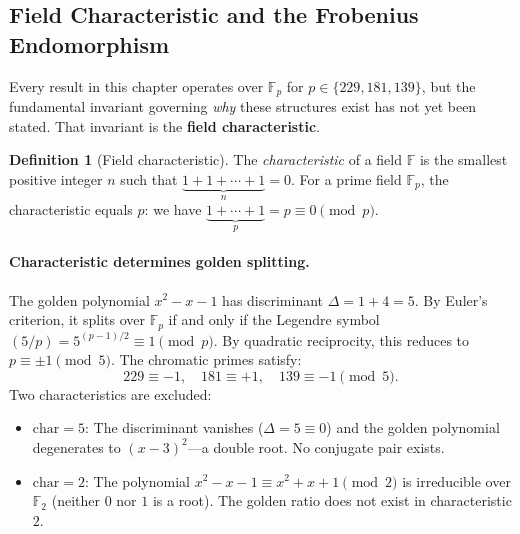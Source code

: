 \documentclass[12pt,oneside]{article}
\theoremstyle{principia}
\theoremstyle{definition}
\newtheorem{definition}[theorem]{Definition}
\theoremstyle{remark}
\begin{document}
\subsection{Field Characteristic and the Frobenius Endomorphism}
\label{sec:characteristic}

Every result in this chapter operates over $\mathbb{F}_p$ for $p \in \{229, 181, 139\}$, but the fundamental invariant governing \emph{why} these structures exist has not yet been stated. That invariant is the \textbf{field characteristic}.

\begin{definition}[Field characteristic]
The \emph{characteristic} of a field $\mathbb{F}$ is the smallest positive integer $n$ such that $\underbrace{1 + 1 + \cdots + 1}_{n} = 0$. For a prime field $\mathbb{F}_p$, the characteristic equals $p$: we have $\underbrace{1 + \cdots + 1}_{p} = p \equiv 0 \pmod{p}$.
\end{definition}

\paragraph{Characteristic determines golden splitting.}
The golden polynomial $x^2 - x - 1$ has discriminant $\Delta = 1 + 4 = 5$. By Euler's criterion, it splits over $\mathbb{F}_p$ if and only if the Legendre symbol $(5/p) = 5^{(p-1)/2} \equiv 1 \pmod{p}$. By quadratic reciprocity, this reduces to $p \equiv \pm 1 \pmod{5}$. The chromatic primes satisfy:
\[
229 \equiv -1, \quad 181 \equiv +1, \quad 139 \equiv -1 \pmod{5}.
\]
Two characteristics are excluded:
\begin{itemize}
\item $\mathrm{char} = 5$: The discriminant vanishes ($\Delta = 5 \equiv 0$) and the golden polynomial degenerates to $(x - 3)^2$---a double root. No conjugate pair exists.
\item $\mathrm{char} = 2$: The polynomial $x^2 - x - 1 \equiv x^2 + x + 1 \pmod{2}$ is irreducible over $\mathbb{F}_2$ (neither $0$ nor $1$ is a root). The golden ratio does not exist in characteristic $2$.
\end{itemize}
\end{document}
